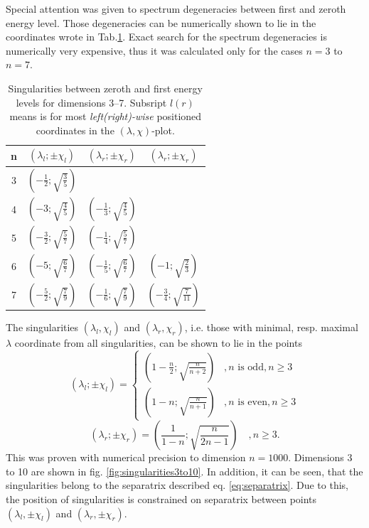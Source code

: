 Special attention was given to spectrum degeneracies between first and zeroth energy level. Those degeneracies can be numerically shown to lie in the coordinates wrote in Tab.\ref{tab:singularities}. Exact search for the spectrum degeneracies is numerically very expensive, thus it was calculated only for the cases $n=3$ to $n=7$.
\begin{table}[H]
    \centering
    \begin{tabular}{c||c|c|c}
     n&$(\lambda_l;\pm\chi_l)$&$(\lambda_r;\pm\chi_r)$&$(\lambda_r;\pm\chi_r)$        \\ \hline\hline
     3&$(-\frac{1}{2};\sqrt{\frac{3}{5}}) $&                                    &        \\
     4&$(-3          ;\sqrt{\frac{4}{5}}) $& $(-\frac{1}{3};\sqrt{\frac{4}{5}})$&        \\
     5&$(-\frac{3}{2};\sqrt{\frac{5}{7}}) $& $(-\frac{1}{4};\sqrt{\frac{5}{7}})$&        \\
     6&$(-5          ;\sqrt{\frac{6}{7}}) $& $(-\frac{1}{5};\sqrt{\frac{6}{7}})$&$(-1          ;\sqrt{\frac{2}{3}}) $        \\
     7&$(-\frac{5}{2};\sqrt{\frac{7}{9}}) $& $(-\frac{1}{6};\sqrt{\frac{7}{9}})$&$(-\frac{3}{4};\sqrt{\frac{7}{11}}) $   
    \end{tabular}
    \caption{Singularities between zeroth and first energy levels for dimensions 3--7. Subsript $l(r)$ means is for most \emph{left(right)-wise} positioned coordinates in the $(\lambda,\chi)$-plot.}
    \label{tab:singularities}
    \end{table}
The singularities $(\lambda_l,\chi_l)$ and $(\lambda_r,\chi_r)$, i.e. those with minimal, resp. maximal $\lambda$ coordinate from all singularities, can be shown to lie in the points
\begin{equation}
    (\lambda_l ;\pm\chi_l)= \begin{cases}
        \left(1-\frac{n}{2};\sqrt{\frac{n}{n+2}}\right) & ,n\text{ is odd}, n\geq 3\\
        \left(1-n;\sqrt{\frac{n}{n+1}}\right) & ,n\text{ is even}, n\geq 3
    \end{cases}
    \label{eq:singularityCoordinateFormulaLeft}
\end{equation}
\begin{equation}
    (\lambda_r ;\pm\chi_r)= 
        \left(\frac{1}{1-n};\sqrt{\frac{n}{2n-1}}\right)\quad , n\geq 3.
        \label{eq:singularityCoordinateFormulaRight}
\end{equation}
This was proven with numerical precision to dimension $n=1000$. Dimensions 3 to 10 are shown in fig. \ref{fig:singularities3to10}.
In addition, it can be seen, that the singularities belong to the separatrix described eq. \ref{eq:separatrix}. Due to this, the position of singularities is constrained on separatrix between points $(\lambda_l,\pm\chi_l)$ and $(\lambda_r,\pm\chi_r)$.



